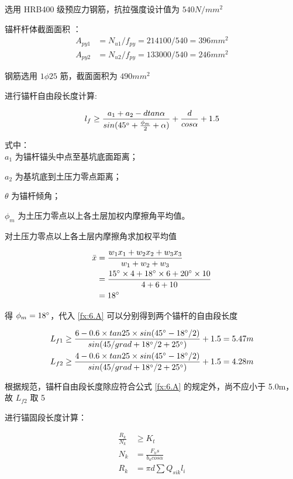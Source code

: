 选用 HRB400 级预应力钢筋，抗拉强度设计值为 $540N/mm^2$

锚杆杆体截面面积 ： 
\begin{align}
A_{py1}&=N_{u1}/f_{py}=214100/540=396mm^2\\
A_{py2}&=N_{u2}/f_{py}=133000/540=246mm^2
\end{align}

钢筋选用 $1 \phi 25$ 筋，截面面积为 $490mm^2$

进行锚杆自由段长度计算:

\begin{align}
    \label{fx:6.A0}
    l_f \geq \frac{a_1+a_2-dtan\alpha}{sin(45^{\circ} +\frac{\phi_m}{2}+\alpha )}+\frac{d}{cos\alpha}+1.5
\end{align}

式中：\\

$a_1$ 为锚杆锚头中点至基坑底面距离；   

$a_2$ 为基坑底到土压力零点距离；      

$\theta$ 为锚杆倾角；                  

$\phi_m$ 为土压力零点以上各土层加权内摩擦角平均值。

对土压力零点以上各土层内摩擦角求加权平均值

\begin{align}
    \label{fx:6.A}
    \bar x&=\frac{w_1x_1+w_2x_2+w_3x_3}{w_1+w_2+w_3}\\
    &=\frac{15^{\circ}\times 4+18^{\circ}\times 6+20^{\circ}\times 10}{4+6+10} \notag \\
    &=18^{\circ} \notag
\end{align}

得 $\phi_m=18 ^{\circ}$，代入 \ref{fx:6.A} 可以分别得到两个锚杆的自由段长度

\begin{align*}
    L_{f1} &\geq \frac{6-0.6\times tan 25\times sin(45^{\circ} -18^{\circ} /2)}{sin(45/grad +18^{\circ} /2+25^{\circ} )}+1.5=5.47 m\\
    L_{f2} &\geq \frac{4-0.6\times tan 25\times sin(45^{\circ} -18^{\circ} /2)}{sin(45/grad +18^{\circ} /2+25^{\circ} )}+1.5=4.28 m
\end{align*}

根据规范，锚杆自由段长度除应符合公式 \ref{fx:6.A} 的规定外，尚不应小于 5.0m，故 $L_{f2}$ 取 5

进行锚固段长度计算：

\begin{align}
    \label{fx:6.B}
    \frac{R_k}{N_k} &\geq K_t\\
    \label{fx:6.BA}
    N_k&=\frac{F_hs}{b_acos\alpha}\\
    \label{fx:6.BB}
    R_k&=\pi d \sum Q_{sik}l_i
\end{align}

